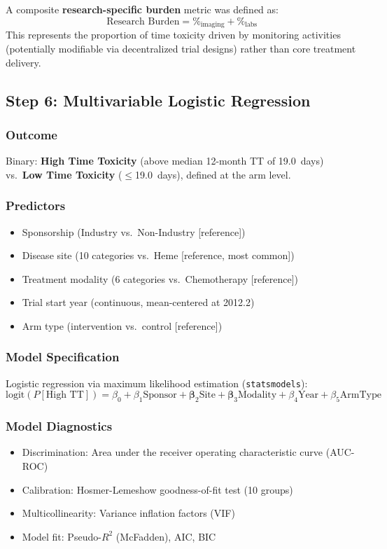 \documentclass[11pt,a4paper]{article}
\begin{document}
A composite \textbf{research-specific burden} metric was defined as:
$$\text{Research Burden} = \text{\%}_{\text{imaging}} + \text{\%}_{\text{labs}}$$
This represents the proportion of time toxicity driven by monitoring activities (potentially modifiable via decentralized trial designs) rather than core treatment delivery.

\subsection{Step 6: Multivariable Logistic Regression}
\label{sec:regression_method}

\subsubsection{Outcome}
Binary: \textbf{High Time Toxicity} (above median 12-month TT of 19.0~days) vs.\ \textbf{Low Time Toxicity} ($\leq$19.0~days), defined at the arm level.

\subsubsection{Predictors}
\begin{itemize}
    \item Sponsorship (Industry vs.\ Non-Industry [reference])
    \item Disease site (10 categories vs.\ Heme [reference, most common])
    \item Treatment modality (6 categories vs.\ Chemotherapy [reference])
    \item Trial start year (continuous, mean-centered at 2012.2)
    \item Arm type (intervention vs.\ control [reference])
\end{itemize}

\subsubsection{Model Specification}
Logistic regression via maximum likelihood estimation (\texttt{statsmodels}):
$$\text{logit}(P[\text{High TT}]) = \beta_0 + \beta_1 \text{Sponsor} + \boldsymbol{\beta}_2 \text{Site} + \boldsymbol{\beta}_3 \text{Modality} + \beta_4 \text{Year} + \beta_5 \text{ArmType}$$

\subsubsection{Model Diagnostics}
\begin{itemize}
    \item Discrimination: Area under the receiver operating characteristic curve (AUC-ROC)
    \item Calibration: Hosmer-Lemeshow goodness-of-fit test (10 groups)
    \item Multicollinearity: Variance inflation factors (VIF)
    \item Model fit: Pseudo-$R^2$ (McFadden), AIC, BIC
\end{itemize}
\end{document}
